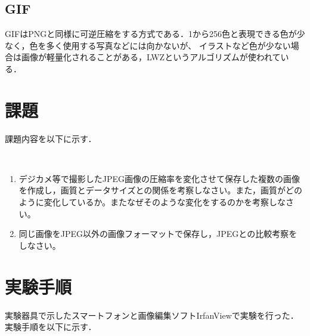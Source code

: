 \documentclass[a4paper,11pt]{bxjsarticle}
\begin{document}
 
\subsection{GIF}
GIFはPNGと同様に可逆圧縮をする方式である．1から256色と表現できる色が少なく，色を多く使用する写真などには向かないが、
イラストなど色が少ない場合は画像が軽量化されることがある，LWZというアルゴリズムが使われている．

\section{課題}
課題内容を以下に示す．

　\begin{enumerate}
    \item デジカメ等で撮影したJPEG画像の圧縮率を変化させて保存した複数の画像を作成し，画質とデータサイズとの関係を考察しなさい。また，画質がどのように変化しているか。またなぜそのような変化をするのかを考察しなさい。
    \item 同じ画像をJPEG以外の画像フォーマットで保存し，JPEGとの比較考察をしなさい。
  \end{enumerate}



\section{実験手順}
実験器具で示したスマートフォンと画像編集ソフトIrfanViewで実験を行った．
実験手順を以下に示す．\\
\end{document}
